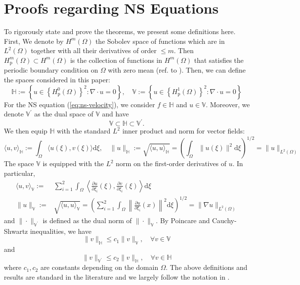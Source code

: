 \documentclass{amsart} %
\def\eqref#1{equation~\ref{#1}}
\def\sH{{\mathbb{H}}}
\def\sV{{\mathbb{V}}}
\theoremstyle{definition}
\theoremstyle{remark}
\renewcommand{\eqref}[1]{\textup{(\ref{#1})}}
\begin{document}
\section{Proofs regarding NS Equations}
\label{sec:app-ns}

To rigorously state and prove the theorems, we present some definitions here.
First, We denote by $H^{m}(\Omega)$ the Sobolev space of functions which are in $L^2(\Omega)$ together with all their derivatives of order $\leq m$. Then $H^{m}_{\mathrm{p}}(\Omega)\subset H^{m}(\Omega)$ is the collection of functions in $H^{m}(\Omega)$ that satisfies the periodic boundary condition on $\Omega$ with zero mean (ref. to \cite[Remark 1.1]{temam1995navier}). Then, we can define the spaces considered in this paper:
\[ \sH := \left\{u \in \left\{ H^{0}_{\mathrm{p}}(\Omega) \right\}^2: \nabla \cdot u = 0 \right\},
\quad 
\sV := \left\{u \in \left\{ H^{1}_{\mathrm{p}}(\Omega) \right\}^2: \nabla \cdot u = 0 \right\}
\]
For the NS equation \eqref{eq:ns-velocity}, we consider $f \in \sH$ and $u \in \sV$. Moreover, we denote $\sV^\prime$ as the dual space of $\sV$ and have
\[ \sV \subset \sH \subset \sV^\prime. \]
We then equip $\sH$ with the standard $L^2$ inner product and norm for vector fields:
\[ \langle u, v \rangle_{\sH} := \int_{\Omega} \langle u(\xi), v(\xi) \rangle \mathrm{d}\xi, \quad \| u \|_{\sH} := \sqrt{\langle u, u \rangle_{\sH}} = \left( \int_{\Omega} \|u(\xi)\|^2 \mathrm{d}\xi \right)^{1/2}= \|u\|_{L^2(\Omega)}\]
The space $\sV$ is equipped with the $L^2$ norm on the first-order derivatives of $u$. In particular,
\[
\begin{aligned}
    \langle u, v \rangle_{\sV} := & \sum_{i=1}^2 \int_{\Omega} \left\langle \frac{\partial u}{\partial \xi_i}(\xi), \frac{\partial v}{\partial \xi_i}(\xi) \right\rangle \mathrm{d}\xi \\ 
    \| u \|_{\sV} := & \sqrt{\langle u, u \rangle_{\sV}} = \left( \sum_{i=1}^2 \int_{\Omega} \left\|\frac{\partial u}{\partial \xi_i}(x) \right\|^2 \mathrm{d}\xi \right)^{1/2} = \|\nabla u\|_{L^2(\Omega)} 
\end{aligned}
\]
and $\|\cdot\|_{\sV^\prime}$ is defined as the dual norm of $\|\cdot\|_{\sV}$. By Poincare and Cauchy-Shwartz inequalities, we have 
\[ \|v\|_{\sH} \leq c_1 \|v\|_{\sV} , \quad \forall v \in \sV\]
and 
\[ \|v\|_{\sV^\prime} \leq c_2 \|v\|_{\sH} , \quad \forall v \in \sH \]
where $c_1,c_2$ are constants depending on the domain $\Omega$. The above definitions and results are standard in the literature and we largely follow the notation in \cite[Section 2]{temam1995navier}.
\end{document}
